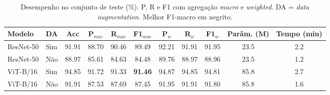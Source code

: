 \begin{table}[t]
\centering
\caption{Desempenho no conjunto de teste (\%). P, R e F1 com agregação \textit{macro} e \textit{weighted}. DA = \textit{data augmentation}. Melhor F1-macro em negrito.}
\label{tab:resultados}
\begin{tabular}{llccccccccc}
\toprule
Modelo & DA & Acc & P$_{mac}$ & R$_{mac}$ & F1$_{mac}$ & P$_{w}$ & R$_{w}$ & F1$_{w}$ & Parâm. (M) & Tempo (min) \\
\midrule
ResNet-50 & Sim & 91.91 & 88.70 & 90.46 & 89.49 & 92.21 & 91.91 & 91.95 & 23.5 & 2.2 \\
ResNet-50 & Não & 88.97 & 85.61 & 84.63 & 84.48 & 89.76 & 88.97 & 88.96 & 23.5 & 1.2 \\
ViT-B/16 & Sim & 94.85 & 91.72 & 91.33 & \textbf{91.46} & 94.87 & 94.85 & 94.81 & 85.8 & 2.7 \\
ViT-B/16 & Não & 91.91 & 87.53 & 87.69 & 87.45 & 91.95 & 91.91 & 91.80 & 85.8 & 1.6 \\
\bottomrule
\end{tabular}
\end{table}
